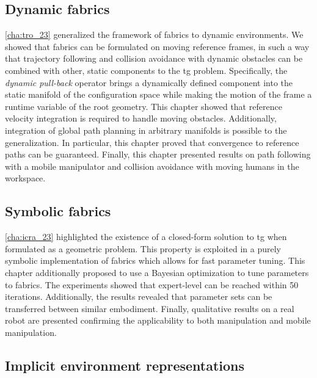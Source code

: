 \subsection{Dynamic fabrics}
\label{sec:conclusion_dynamic_fabrics}

\cref{cha:tro_23} generalized the framework of \ac{fabrics} to dynamic
environments. We showed that \ac{fabrics} can be formulated on moving reference
frames, in such a way that trajectory following and collision avoidance with
dynamic obstacles can be combined with other, static components to the \ac{tg}
problem. Specifically, the \textit{dynamic pull-back}
operator brings a dynamically defined component into the static manifold of the
configuration space while making the motion of the frame a runtime variable of
the root geometry. This chapter showed that reference velocity integration is
required to handle moving obstacles. Additionally, integration of global path
planning in arbitrary manifolds is possible to the generalization. In
particular, this chapter proved that convergence to reference paths can be 
guaranteed. Finally, this chapter presented results on path following with a
mobile manipulator and collision avoidance with moving humans in the workspace.


\subsection{Symbolic fabrics}
\label{sec:conclusion_symbolic_fabrics}

\cref{cha:icra_23} highlighted the existence of a
closed-form solution to \ac{tg} when formulated as a geometric problem.
This property is exploited in a purely symbolic implementation of \ac{fabrics}
which allows for fast parameter tuning. This chapter additionally
proposed to use a Bayesian optimization to tune parameters to \ac{fabrics}.
The experiments showed that expert-level can be reached within 50 iterations.
Additionally, the results revealed that parameter sets can be transferred between
similar embodiment. Finally, qualitative results on a real robot are presented
confirming the applicability to both manipulation and mobile
manipulation.

\subsection{Implicit environment representations}
\label{sec:conclusion_implicit}


